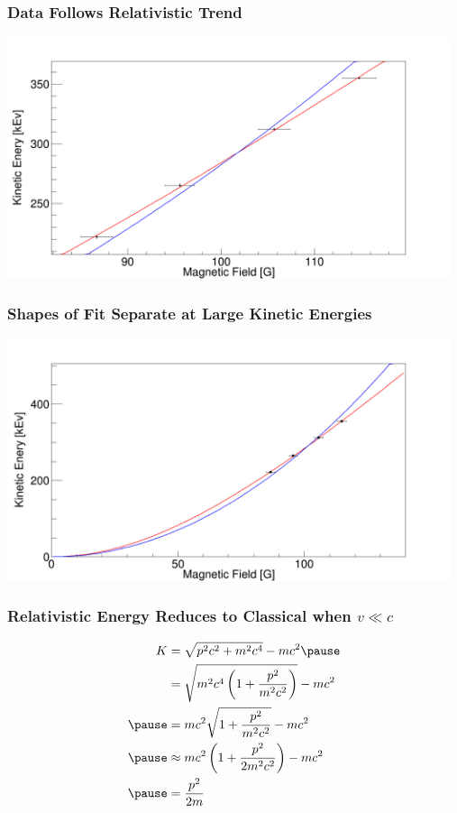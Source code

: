 \documentclass{beamer}
\begin{document}
\begin{frame}
  \frametitle{Data Follows Relativistic Trend}
  \includegraphics[width=13cm]{finalfit.png}
\end{frame}

\begin{frame}
  \frametitle{Shapes of Fit Separate at Large Kinetic Energies}
  \includegraphics[width=13cm]{finalfitzoom.png}
\end{frame}

\begin{frame}
  \frametitle{Relativistic Energy Reduces to Classical when $v \ll c$}
  \begin{equation*}
    \begin{aligned}
      K &= \sqrt{p^2 c^2 + m^2 c^4} - mc^2
      \pause
      \\
      &= \sqrt{m^2c^4 \left(1 + \frac{p^2}{m^2 c^2}\right)} - mc^2
      \\
      \pause
      &= mc^2\sqrt{1 + \frac{p^2}{m^2 c^2}} - mc^2
      \\
      \pause 
      &\approx mc^2 \left(1 + \frac{p^2}{2m^2 c^2}\right) - mc^2
      \\
      \pause 
      &= \frac{p^2}{2m}
    \end{aligned}
  \end{equation*}
\end{frame}
\end{document}
